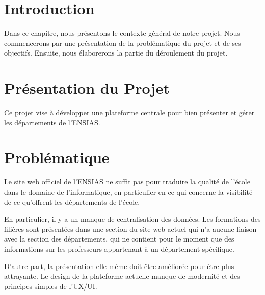 \section{Introduction}
Dans ce chapitre, nous présentons le contexte général de notre projet. Nous commencerons par une présentation de la problématique du projet et de ses objectifs. Ensuite, nous élaborerons la partie du déroulement du projet.
\newpage
\section{Présentation du Projet}
Ce projet vise à développer une plateforme centrale pour bien présenter et gérer les départements de l'ENSIAS.

\section{Problématique}
Le site web officiel de l'ENSIAS ne suffit pas pour traduire la qualité de l'école dans le domaine de l'informatique, en particulier en ce qui concerne la visibilité de ce qu'offrent les départements de l'école.

En particulier, il y a un manque de centralisation des données. Les formations des filières sont présentées dans une section du site web actuel qui n'a aucune liaison avec la section des départements, qui ne contient pour le moment que des informations sur les professeurs appartenant à un département spécifique.

D'autre part, la présentation elle-même doit être améliorée pour être plus attrayante. Le design de la plateforme actuelle manque de modernité et des principes simples de l'UX/UI.

